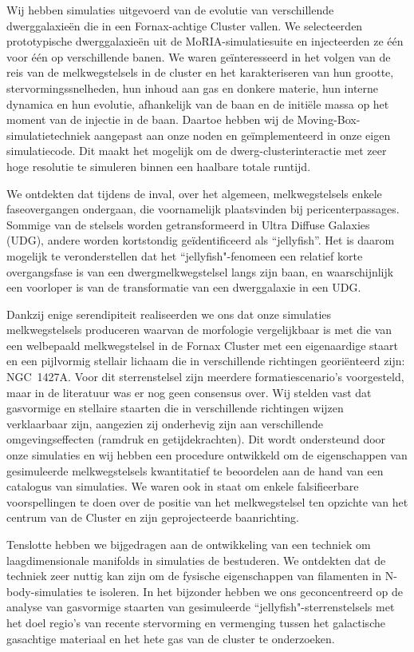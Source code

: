 Wij hebben simulaties uitgevoerd van de evolutie van verschillende dwerggalaxieën die in een Fornax-achtige Cluster vallen.
We selecteerden prototypische dwerggalaxieën uit de MoRIA-simulatiesuite en injecteerden ze één voor één op verschillende banen.
We waren geïnteresseerd in het volgen van de reis van de melkwegstelsels in de cluster en het karakteriseren van hun grootte, stervormingssnelheden, hun inhoud aan gas en donkere materie, hun interne dynamica en hun evolutie, afhankelijk van de baan en de initiële massa op het moment van de injectie in de baan.
Daartoe hebben wij de Moving-Box-simulatietechniek aangepast aan onze noden en geïmplementeerd in onze eigen simulatiecode.
Dit maakt het mogelijk om de dwerg-clusterinteractie met zeer hoge resolutie te simuleren binnen een haalbare totale runtijd.

We ontdekten dat tijdens de inval, over het algemeen, melkwegstelsels enkele faseovergangen ondergaan, die voornamelijk  plaatsvinden bij pericenterpassages.
Sommige van de stelsels  worden getransformeerd in Ultra Diffuse Galaxies (UDG), andere worden kortstondig geïdentificeerd als ``jellyfish''.
Het is daarom mogelijk te veronderstellen dat het ``jellyfish"-fenomeen een relatief korte overgangsfase is van een dwergmelkwegstelsel langs zijn baan, en waarschijnlijk een voorloper is van de transformatie van een dwerggalaxie in een UDG.

Dankzij enige serendipiteit realiseerden we ons dat onze simulaties melkwegstelsels produceren waarvan de morfologie vergelijkbaar is met die van een welbepaald melkwegstelsel in de Fornax Cluster met een eigenaardige  \Hi{} staart en een pijlvormig stellair lichaam die in verschillende richtingen georiënteerd zijn: NGC~1427A.
Voor dit sterrenstelsel zijn meerdere formatiescenario's voorgesteld, maar in de literatuur was er nog geen consensus over.
Wij stelden vast dat gasvormige en stellaire staarten die in verschillende richtingen wijzen verklaarbaar zijn, aangezien zij onderhevig zijn aan verschillende omgevingseffecten (ramdruk en getijdekrachten).
Dit wordt ondersteund door onze simulaties en wij hebben een procedure ontwikkeld om de eigenschappen van gesimuleerde melkwegstelsels kwantitatief te beoordelen aan de hand van een catalogus van simulaties.
We waren ook in staat om enkele falsifieerbare voorspellingen te doen over de positie van het melkwegstelsel ten opzichte van het centrum van de Cluster en zijn geprojecteerde baanrichting.

Tenslotte hebben we bijgedragen aan de ontwikkeling van een techniek om laagdimensionale manifolds in simulaties de bestuderen.
We ontdekten dat de techniek zeer nuttig kan zijn om de fysische eigenschappen van filamenten in N-body-simulaties te isoleren.
In het bijzonder hebben we ons geconcentreerd op de analyse van gasvormige staarten van gesimuleerde ``jellyfish"-sterrenstelsels met het doel regio's van recente stervorming en vermenging tussen het galactische gasachtige materiaal en het hete gas van de cluster te onderzoeken.

